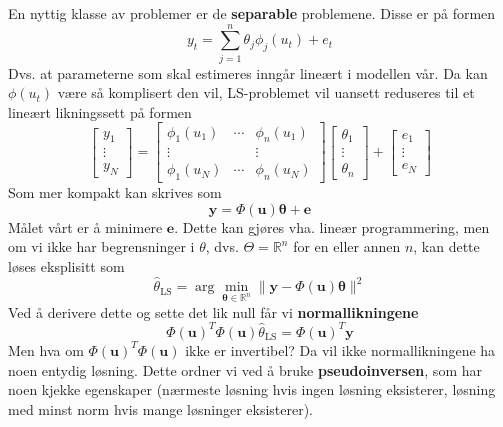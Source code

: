 En nyttig klasse av problemer er de \textbf{separable} problemene. Disse er på formen
\begin{equation}
y_{t}=\sum_{j=1}^{n} \theta_{j} \phi_{j}\left(u_{t}\right)+e_{t}
\end{equation}
Dvs. at parameterne som skal estimeres inngår lineært i modellen vår. Da kan $\phi(u_t)$ være så komplisert den vil, LS-problemet vil uansett reduseres til et lineært likningssett på formen
\begin{equation}
\left[\begin{array}{c}
{y_{1}} \\
{\vdots} \\
{y_{N}}
\end{array}\right]=\left[\begin{array}{ccc}
{\phi_{1}\left(u_{1}\right)} & {\cdots} & {\phi_{n}\left(u_{1}\right)} \\
{\vdots} & {} & {\vdots} \\
{\phi_{1}\left(u_{N}\right)} & {\cdots} & {\phi_{n}\left(u_{N}\right)}
\end{array}\right]\left[\begin{array}{c}
{\theta_{1}} \\
{\vdots} \\
{\theta_{n}}
\end{array}\right]+\left[\begin{array}{c}
{e_{1}} \\
{\vdots} \\
{e_{N}}
\end{array}\right]
\end{equation}
Som mer kompakt kan skrives som
\begin{equation}
\boldsymbol{y}=\Phi(\boldsymbol{u}) \boldsymbol{\theta}+\boldsymbol{e}
\end{equation}
Målet vårt er å minimere $\mathbf{e}$. Dette kan gjøres vha. lineær programmering, men om vi ikke har begrensninger i $\theta$, dvs. $\Theta = \mathbb{R}^n$ for en eller annen $n$, kan dette løses eksplisitt som
\begin{equation}
\widehat{\theta}_{\mathrm{LS}}=\arg \min _{\boldsymbol{\theta} \in \mathbb{R}^{n}}\|\boldsymbol{y}-\Phi(\boldsymbol{u}) \boldsymbol{\theta}\|^{2}
\end{equation}
Ved å derivere dette og sette det lik null får vi \textbf{normallikningene}
\begin{equation}
\Phi(\boldsymbol{u})^{T} \Phi(\boldsymbol{u}) \widehat{\theta}_{\mathrm{LS}}=\Phi(\boldsymbol{u})^{T} \boldsymbol{y}
\end{equation}
Men hva om $
\Phi(\boldsymbol{u})^{T} \Phi(\boldsymbol{u})
$ ikke er invertibel? Da vil ikke normallikningene ha noen entydig løsning. Dette ordner vi ved å bruke \textbf{pseudoinversen}, som har noen kjekke egenskaper (nærmeste løsning hvis ingen løsning eksisterer, løsning med minst norm hvis mange løsninger eksisterer).

